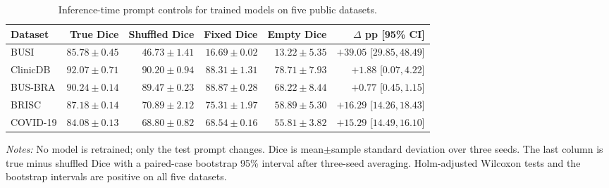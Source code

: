 \ifnum{}
\begin{table}[htbp]
\centering
\caption{Inference-time prompt controls for trained \methodname{} models on
five public datasets.}
\label{tab:bspc_semantic_controls}
\scriptsize
\setlength{\tabcolsep}{4.5pt}
\begin{tabular}{@{}lrrrrr@{}}
\toprule
Dataset & True Dice & Shuffled Dice & Fixed Dice & Empty Dice & $\Delta$ pp [95\% CI] \\
\midrule
BUSI     & $85.78\pm0.45$ & $46.73\pm1.41$ & $16.69\pm0.02$ & $13.22\pm5.35$ & $+39.05$ [$29.85,48.49$] \\
ClinicDB & $92.07\pm0.71$ & $90.20\pm0.94$ & $88.31\pm1.31$ & $78.71\pm7.93$ & $+1.88$ [$0.07,4.22$] \\
BUS-BRA  & $90.24\pm0.14$ & $89.47\pm0.23$ & $88.87\pm0.28$ & $68.22\pm8.44$ & $+0.77$ [$0.45,1.15$] \\
BRISC    & $87.18\pm0.14$ & $70.89\pm2.12$ & $75.31\pm1.97$ & $58.89\pm5.30$ & $+16.29$ [$14.26,18.43$] \\
COVID-19 & $84.08\pm0.13$ & $68.80\pm0.82$ & $68.54\pm0.16$ & $55.81\pm3.82$ & $+15.29$ [$14.49,16.10$] \\
\bottomrule
\end{tabular}
\vspace{2pt}
\begin{minipage}{0.98\linewidth}
\footnotesize\raggedright
\textit{Notes:} No model is retrained; only the test prompt changes. Dice is
mean$\pm$sample standard deviation over three seeds. The last column is true
minus shuffled Dice with a paired-case bootstrap 95\% interval after
three-seed averaging. Holm-adjusted Wilcoxon tests and the bootstrap intervals
are positive on all five datasets.\par
\end{minipage}
\end{table}
\fi

\ifnum{}

\fi

